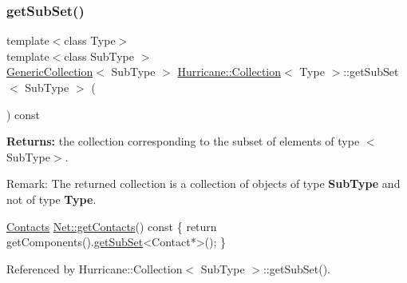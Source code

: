 \subsubsection{\texorpdfstring{get\+Sub\+Set()}{getSubSet()}\hspace{0.1cm}{\footnotesize\ttfamily [2/3]}}
{\footnotesize\ttfamily template$<$class Type$>$ \\
template$<$class Sub\+Type $>$ \\
\mbox{\hyperlink{classHurricane_1_1GenericCollection}{Generic\+Collection}}$<$ Sub\+Type $>$ \mbox{\hyperlink{classHurricane_1_1Collection}{Hurricane\+::\+Collection}}$<$ Type $>$\+::get\+Sub\+Set$<$ Sub\+Type $>$ (\begin{DoxyParamCaption}{ }\end{DoxyParamCaption}) const\hspace{0.3cm}{\ttfamily [inline]}}

{\bfseries Returns\+:} the collection corresponding to the subset of elements of type {\ttfamily $<$Sub\+Type$>$}.

\begin{DoxyParagraph}{Remark\+: The returned collection is a collection of objects of type }
{\bfseries Sub\+Type} and not of type {\bfseries Type}.
\end{DoxyParagraph}

\begin{DoxyCode}
\mbox{\hyperlink{namespaceHurricane_a1e6a8ab09f688509bd727b3fee02d0d2}{Contacts}} \mbox{\hyperlink{classHurricane_1_1Net_a9c397596fe9ecbf674712c72e0b9010c}{Net::getContacts}}()\textcolor{keyword}{ const}
\textcolor{keyword}{}\{
   \textcolor{keywordflow}{return} getComponents().\mbox{\hyperlink{classHurricane_1_1Collection_aa32ea7249d57ee05e3c71dcde8106832}{getSubSet}}<Contact*>();
\}
\end{DoxyCode}
 

Referenced by Hurricane\+::\+Collection$<$ Sub\+Type $>$\+::get\+Sub\+Set().

\mbox{\label{classHurricane_1_1Collection_a673afd14782da82ad03a68366ae1f09b}} 
